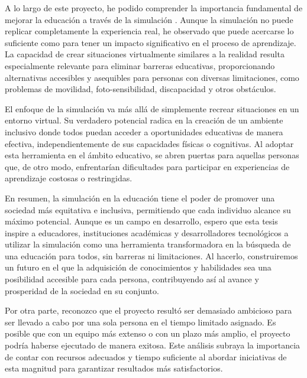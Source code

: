 A lo largo de este proyecto, he podido comprender la importancia fundamental de mejorar la educación a través de la simulación \cite{Simulacion}. Aunque la simulación no puede replicar completamente la experiencia real, he observado que puede acercarse lo suficiente como para tener un impacto significativo en el proceso de aprendizaje. La capacidad de crear situaciones virtualmente similares a la realidad resulta especialmente relevante para eliminar barreras educativas, proporcionando alternativas accesibles y asequibles para personas con diversas limitaciones, como problemas de movilidad, foto-sensibilidad, discapacidad y otros obstáculos.

El enfoque de la simulación va más allá de simplemente recrear situaciones en un entorno virtual. Su verdadero potencial radica en la creación de un ambiente inclusivo donde todos puedan acceder a oportunidades educativas de manera efectiva, independientemente de sus capacidades físicas o cognitivas. Al adoptar esta herramienta en el ámbito educativo, se abren puertas para aquellas personas que, de otro modo, enfrentarían dificultades para participar en experiencias de aprendizaje costosas o restringidas.

En resumen, la simulación en la educación tiene el poder de promover una sociedad más equitativa e inclusiva, permitiendo que cada individuo alcance su máximo potencial. Aunque es un campo en desarrollo, espero que esta tesis inspire a educadores, instituciones académicas y desarrolladores tecnológicos a utilizar la simulación como una herramienta transformadora en la búsqueda de una educación para todos, sin barreras ni limitaciones. Al hacerlo, construiremos un futuro en el que la adquisición de conocimientos y habilidades sea una posibilidad accesible para cada persona, contribuyendo así al avance y prosperidad de la sociedad en su conjunto.

Por otra parte, reconozco que el proyecto resultó ser demasiado ambicioso para ser llevado a cabo por una sola persona en el tiempo limitado asignado. Es posible que con un equipo más extenso o con un plazo más amplio, el proyecto podría haberse ejecutado de manera exitosa. Este análisis subraya la importancia de contar con recursos adecuados y tiempo suficiente al abordar iniciativas de esta magnitud para garantizar resultados más satisfactorios.